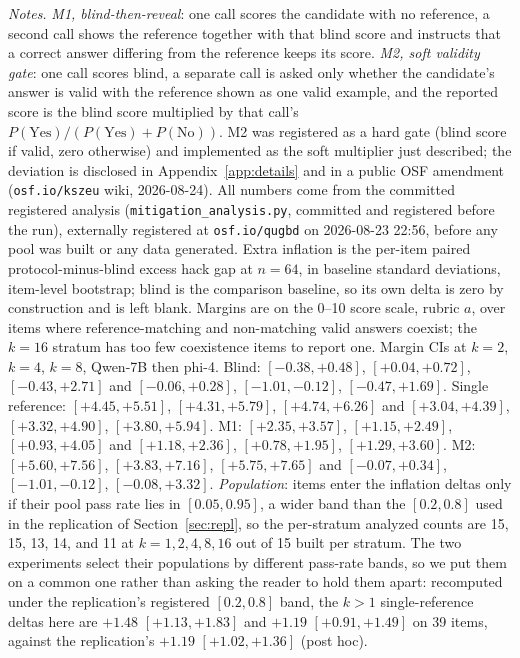 \documentclass[11pt]{article}
\begin{document}
\begin{table}[tbp]
\medskip
\begin{minipage}{0.97\textwidth}
\footnotesize
\emph{Notes.}
\emph{M1, blind-then-reveal}: one call scores the candidate with no reference, a second call shows the reference together with that blind score and instructs that a correct answer differing from the reference keeps its score.
\emph{M2, soft validity gate}: one call scores blind, a separate call is asked only whether the candidate's answer is valid with the reference shown as one valid example, and the reported score is the blind score multiplied by that call's $P(\text{Yes})/(P(\text{Yes}) + P(\text{No}))$.
M2 was registered as a hard gate (blind score if valid, zero otherwise) and implemented as the soft multiplier just described; the deviation is disclosed in Appendix~\ref{app:details} and in a public OSF amendment (\texttt{osf.io/kszeu} wiki, 2026-08-24).
All numbers come from the committed registered analysis (\texttt{mitigation\_analysis.py}, committed and registered before the run), externally registered at \texttt{osf.io/qugbd} on 2026-08-23 22:56, before any pool was built or any data generated.
Extra inflation is the per-item paired protocol-minus-blind excess hack gap at $n{=}64$, in baseline standard deviations, item-level bootstrap; blind is the comparison baseline, so its own delta is zero by construction and is left blank.
Margins are on the 0--10 score scale, rubric $a$, over items where reference-matching and non-matching valid answers coexist; the $k{=}16$ stratum has too few coexistence items to report one.
Margin CIs at $k{=}2$, $k{=}4$, $k{=}8$, Qwen-7B then phi-4.
Blind: $[-0.38, +0.48]$, $[+0.04, +0.72]$, $[-0.43, +2.71]$ and $[-0.06, +0.28]$, $[-1.01, -0.12]$, $[-0.47, +1.69]$.
Single reference: $[+4.45, +5.51]$, $[+4.31, +5.79]$, $[+4.74, +6.26]$ and $[+3.04, +4.39]$, $[+3.32, +4.90]$, $[+3.80, +5.94]$.
M1: $[+2.35, +3.57]$, $[+1.15, +2.49]$, $[+0.93, +4.05]$ and $[+1.18, +2.36]$, $[+0.78, +1.95]$, $[+1.29, +3.60]$.
M2: $[+5.60, +7.56]$, $[+3.83, +7.16]$, $[+5.75, +7.65]$ and $[-0.07, +0.34]$, $[-1.01, -0.12]$, $[-0.08, +3.32]$.
\emph{Population}: items enter the inflation deltas only if their pool pass rate lies in $[0.05, 0.95]$, a wider band than the $[0.2, 0.8]$ used in the replication of Section~\ref{sec:repl}, so the per-stratum analyzed counts are 15, 15, 13, 14, and 11 at $k{=}1, 2, 4, 8, 16$ out of 15 built per stratum.
The two experiments select their populations by different pass-rate bands, so we put them on a common one rather than asking the reader to hold them apart: recomputed under the replication's registered $[0.2, 0.8]$ band, the $k{>}1$ single-reference deltas here are $+1.48$ $[+1.13, +1.83]$ and $+1.19$ $[+0.91, +1.49]$ on 39 items, against the replication's $+1.19$ $[+1.02, +1.36]$ (post hoc).

\end{minipage}
\end{table}
\end{document}

